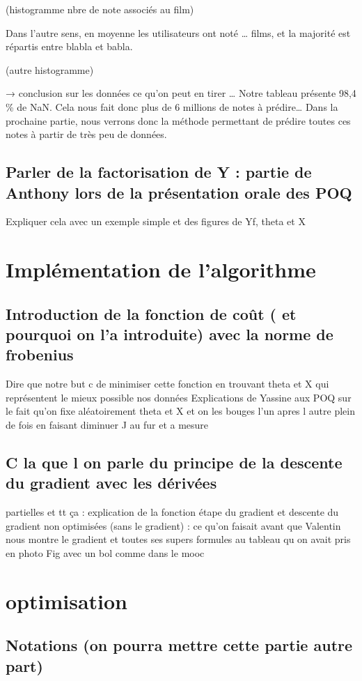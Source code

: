 \documentclass[a4paper,10pt]{article}
\begin{document}
(histogramme nbre de note associés au film)

Dans l’autre sens, en moyenne les utilisateurs ont noté … films, et la majorité est répartis entre blabla et babla.

(autre histogramme)

→ conclusion sur les données ce qu’on peut en tirer …
Notre tableau présente 98,4 \% de NaN. Cela nous fait donc plus de 6 millions de notes à prédire… Dans la prochaine partie, nous verrons donc la méthode permettant de prédire toutes ces notes à partir de très peu de données.

\subsection{Parler de la factorisation de Y : partie de Anthony lors de la présentation orale des POQ}
Expliquer cela avec un exemple simple et des figures de Yf, theta et X
\section{Implémentation de l’algorithme}
\subsection{Introduction de la fonction de coût ( et pourquoi on l'a introduite) avec la norme de frobenius}
Dire que notre but c de minimiser cette fonction en trouvant theta et X qui représentent le mieux possible nos données 
    Explications de Yassine aux POQ sur le fait qu’on fixe aléatoirement theta et X et on les bouges l'un apres l autre plein de fois en faisant diminuer J au fur et a mesure
\subsection{C la que l on parle du principe de la descente du gradient avec les dérivées}
partielles et tt ça : explication de la fonction étape du gradient et descente du gradient non optimisées (sans le gradient) : ce qu'on faisait avant que Valentin nous montre le gradient et toutes ses supers formules au tableau qu on avait pris en photo
Fig avec un bol comme dans le mooc
\section{optimisation}

\subsection{Notations (on pourra mettre cette partie autre part)}
\end{document}
